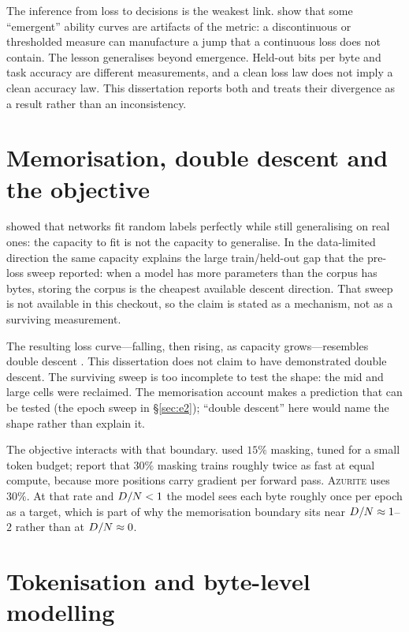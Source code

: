 The inference from loss to decisions is the weakest link. \citet{schaeffer2023emergent}
show that some ``emergent'' ability curves are artifacts of the metric: a
discontinuous or thresholded measure can manufacture a jump that a continuous
loss does not contain. The lesson generalises beyond emergence. Held-out bits per
byte and task accuracy are different measurements, and a clean loss law does not
imply a clean accuracy law. This dissertation reports both and treats their
divergence as a result rather than an inconsistency.

\section{Memorisation, double descent and the objective}

\citet{zhang2017rethinking} showed that networks fit random labels perfectly while
still generalising on real ones: the capacity to fit is not the capacity to
generalise. In the data-limited direction the same capacity explains the large
train/held-out gap that the pre-loss sweep reported: when a model has more
parameters than the corpus has bytes, storing the corpus is the cheapest available
descent direction. That sweep is not available in this checkout, so the claim is
stated as a mechanism, not as a surviving measurement.

The resulting loss curve---falling, then rising, as capacity grows---resembles
double descent \citep{belkin2019reconciling,nakkiran2020deep}. This dissertation
does not claim to have demonstrated double descent. The surviving sweep is too
incomplete to test the shape: the mid and large cells were reclaimed. The
memorisation account makes a prediction that can be tested (the epoch sweep in
\S\ref{sec:e2}); ``double descent'' here would name the shape rather than explain
it.

The objective interacts with that boundary. \citet{devlin2019bert} used $15\%$
masking, tuned for a small token budget; \citet{portes2023mosaicbert} report that
$30\%$ masking trains roughly twice as fast at equal compute, because more
positions carry gradient per forward pass. \textsc{Azurite} uses $30\%$. At that
rate and $D/N < 1$ the model sees each byte roughly once per epoch as a target,
which is part of why the memorisation boundary sits near $D/N \approx 1$--$2$
rather than at $D/N \approx 0$.

\section{Tokenisation and byte-level modelling}

